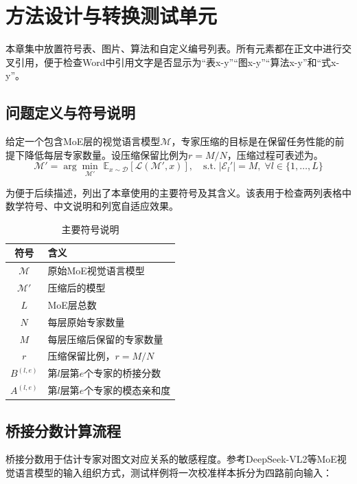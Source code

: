 \section{方法设计与转换测试单元}
本章集中放置符号表、图片、算法和自定义编号列表。所有元素都在正文中进行交叉引用，便于检查Word中引用文字是否显示为“表x-y”“图x-y”“算法x-y”和“式x-y”。

\subsection{问题定义与符号说明}
给定一个包含MoE层的视觉语言模型$\mathcal{M}$，专家压缩的目标是在保留任务性能的前提下降低每层专家数量。设压缩保留比例为$r=M/N$，压缩过程可表述为。
\begin{equation}
    \label{eq:compression_objective}
    \mathcal{M}' = \arg\min_{\mathcal{M}'} \; \mathbb{E}_{x \sim \mathcal{D}} \left[ \mathcal{L}(\mathcal{M}', x) \right], \quad \text{s.t.} \; |\mathcal{E}_l'| = M, \; \forall l \in \{1, \dots, L\}
\end{equation}

为便于后续描述，列出了本章使用的主要符号及其含义。该表用于检查两列表格中数学符号、中文说明和列宽自适应效果。

\begin{table}[!ht]
    \centering
    \caption{主要符号说明}
    \label{chart:symbols}
    \begin{tabular}{cl}
    \toprule
        符号 & 含义 \\ \midrule
        $\mathcal{M}$ & 原始MoE视觉语言模型 \\
        $\mathcal{M}'$ & 压缩后的模型 \\
        $L$ & MoE层总数 \\
        $N$ & 每层原始专家数量 \\
        $M$ & 每层压缩后保留的专家数量 \\
        $r$ & 压缩保留比例，$r=M/N$ \\
        $B^{(l,e)}$ & 第$l$层第$e$个专家的桥接分数 \\
        $A^{(l,e)}$ & 第$l$层第$e$个专家的模态亲和度 \\
    \bottomrule
    \end{tabular}
\end{table}

\subsection{桥接分数计算流程}
桥接分数用于估计专家对图文对应关系的敏感程度。参考DeepSeek-VL2等MoE视觉语言模型的输入组织方式\cite{wu2024deepseekvl2}，测试样例将一次校准样本拆分为四路前向输入：

